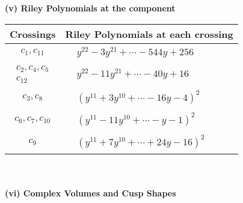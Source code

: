 \documentclass[1p]{elsarticle_modified}
\theoremstyle{definition}
\begin{document}
\newpage\renewcommand{\arraystretch}{1}
\flushleft \textbf{(v) Riley Polynomials at the component}\newline \\
\begin{tabular}{m{50pt}|m{274pt}}
Crossings & \hspace{64pt}Riley Polynomials at each crossing \\
\hline $$\begin{aligned}c_{1},c_{11}\end{aligned}$$&$\begin{aligned}
&y^{22}-3 y^{21}+\cdots-544 y+256
\end{aligned}$\\
\hline $$\begin{aligned}c_{2},c_{4},c_{5}\\c_{12}\end{aligned}$$&$\begin{aligned}
&y^{22}-11 y^{21}+\cdots-40 y+16
\end{aligned}$\\
\hline $$\begin{aligned}c_{3},c_{8}\end{aligned}$$&$\begin{aligned}
&(y^{11}+3 y^{10}+\cdots-16 y-4)^{2}
\end{aligned}$\\
\hline $$\begin{aligned}c_{6},c_{7},c_{10}\end{aligned}$$&$\begin{aligned}
&(y^{11}-11 y^{10}+\cdots- y-1)^{2}
\end{aligned}$\\
\hline $$\begin{aligned}c_{9}\end{aligned}$$&$\begin{aligned}
&(y^{11}+7 y^{10}+\cdots+24 y-16)^{2}
\end{aligned}$\\
\hline
\end{tabular}\\~\\
\newpage\flushleft \textbf{(vi) Complex Volumes and Cusp Shapes}
\end{document}
